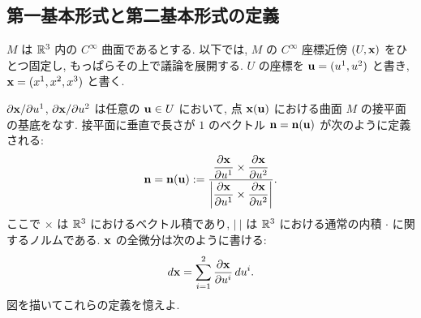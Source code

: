 \documentclass[12pt,twoside]{jarticle}
\begin{document}

\subsection{第一基本形式と第二基本形式の定義}

$M$ は ${\mathbb R}^3$ 内の $C^\infty$ 曲面であるとする. 
以下では, $M$ の $C^\infty$ 座標近傍 $(U,{\mathbf x})$ をひとつ固定し, 
もっぱらその上で議論を展開する.
$U$ の座標を ${\mathbf u} = (u^1, u^2)$ と書き, ${\mathbf x}=(x^1,x^2,x^3)$ と書く.

$\partial{\mathbf x}/\partial u^1$, $\partial{\mathbf x}/\partial u^2$ は任意の ${\mathbf u}\in U$ において, 
点 ${\mathbf x}({\mathbf u})$ における曲面 $M$ の接平面の基底をなす. 
接平面に垂直で長さが $1$ のベクトル ${\mathbf n}={\mathbf n}({\mathbf u})$ が次のように定義される:
\[
  {\mathbf n} = {\mathbf n}({\mathbf u}) := 
  \frac
  {\dfrac{\partial{\mathbf x}}{\partial u^1} \times \dfrac{\partial{\mathbf x}}{\partial u^2}}
  {\left|\dfrac{\partial{\mathbf x}}{\partial u^1} \times \dfrac{\partial{\mathbf x}}{\partial u^2}\right|}.
\]
ここで $\times$ は ${\mathbb R}^3$ におけるベクトル積であり, 
$|\ |$ は ${\mathbb R}^3$ における通常の内積 $\cdot$ に関するノルムである.
${\mathbf x}$ の全微分は次のように書ける:
\[
  d{\mathbf x} = \sum_{i=1}^2 \dfrac{\partial{\mathbf x}}{\partial u^i}  \, du^i.
\]
図を描いてこれらの定義を憶えよ.
\end{document}
